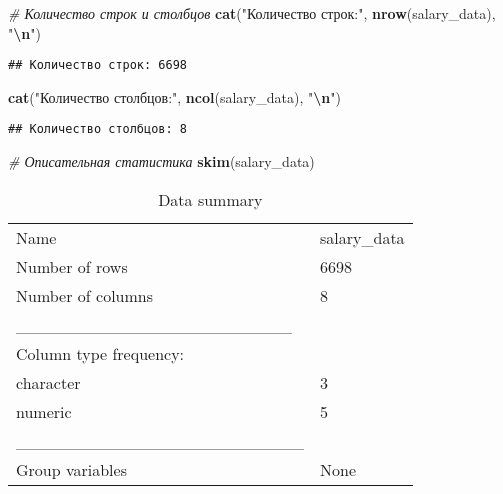 \documentclass[
]{article}
\newenvironment{Shaded}{\begin{snugshade}}{\end{snugshade}}
\newcommand{\CommentTok}[1]{\textcolor[rgb]{0.56,0.35,0.01}{\textit{#1}}}
\newcommand{\FunctionTok}[1]{\textcolor[rgb]{0.13,0.29,0.53}{\textbf{#1}}}
\newcommand{\NormalTok}[1]{#1}
\newcommand{\SpecialCharTok}[1]{\textcolor[rgb]{0.81,0.36,0.00}{\textbf{#1}}}
\newcommand{\StringTok}[1]{\textcolor[rgb]{0.31,0.60,0.02}{#1}}
\begin{document}
\begin{Shaded}
\begin{Highlighting}[]
\CommentTok{\# Количество строк и столбцов}
\FunctionTok{cat}\NormalTok{(}\StringTok{"Количество строк:"}\NormalTok{, }\FunctionTok{nrow}\NormalTok{(salary\_data), }\StringTok{"}\SpecialCharTok{\textbackslash{}n}\StringTok{"}\NormalTok{)}
\end{Highlighting}
\end{Shaded}

\begin{verbatim}
## Количество строк: 6698
\end{verbatim}

\begin{Shaded}
\begin{Highlighting}[]
\FunctionTok{cat}\NormalTok{(}\StringTok{"Количество столбцов:"}\NormalTok{, }\FunctionTok{ncol}\NormalTok{(salary\_data), }\StringTok{"}\SpecialCharTok{\textbackslash{}n}\StringTok{"}\NormalTok{)}
\end{Highlighting}
\end{Shaded}

\begin{verbatim}
## Количество столбцов: 8
\end{verbatim}

\begin{Shaded}
\begin{Highlighting}[]
\CommentTok{\# Описательная статистика}
\FunctionTok{skim}\NormalTok{(salary\_data)}
\end{Highlighting}
\end{Shaded}

\begin{longtable}[]{@{}ll@{}}
\caption{Data summary}\tabularnewline
\toprule\noalign{}
\endfirsthead
\endhead
\bottomrule\noalign{}
\endlastfoot
Name & salary\_data \\
Number of rows & 6698 \\
Number of columns & 8 \\
\_\_\_\_\_\_\_\_\_\_\_\_\_\_\_\_\_\_\_\_\_\_\_ & \\
Column type frequency: & \\
character & 3 \\
numeric & 5 \\
\_\_\_\_\_\_\_\_\_\_\_\_\_\_\_\_\_\_\_\_\_\_\_\_ & \\
Group variables & None \\
\end{longtable}
\end{document}
